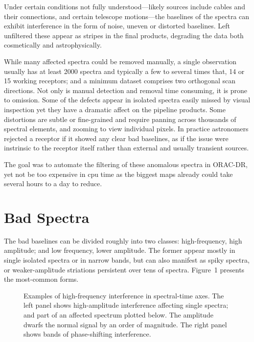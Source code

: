 Under certain conditions not fully understood---likely sources include 
cables and their connections, and certain telescope motions---the 
baselines of the spectra can exhibit interference in the form of noise, 
uneven or distorted baselines.  Left unfiltered these appear as stripes 
in the final products, degrading the data both cosmetically and 
astrophysically.

While many affected spectra could be removed manually, a single 
observation usually has at least 2000 spectra and typically a few to 
several times that, 14 or 15 working receptors; and a minimum dataset 
comprises two orthogonal scan directions.  Not only is manual detection 
and removal time consuming, it is prone to omission.  Some of the 
defects appear in isolated spectra easily missed by visual inspection 
yet they have a dramatic affect on the pipeline products.  Some 
distortions are subtle or fine-grained and require panning across 
thousands of spectral elements, and zooming to view individual pixels.  
In practice astronomers rejected a receptor if it showed any clear bad 
baselines, as if the issue were instrinsic to the receptor itself rather 
than external and usually transient sources.

The goal was to automate the filtering of these anomalous spectra in 
ORAC-DR, yet not be too expensive in cpu time as the biggest maps
already could take several hours to a day to reduce.

\section{Bad Spectra}

The bad baselines can be divided roughly into two classes: 
high-frequency, high amplitude; and low frequency, lower amplitude. The 
former appear mostly in single isolated spectra or in narrow bands,
but can also manifest as spiky spectra, or weaker-amplitude striations 
persistent over tens of spectra.  Figure~1 presents the most-common forms.

\begin{figure}[!ht]
\caption{Examples of high-frequency interference in spectral-time axes. 
The left panel shows high-amplitude interference affecting single
spectra; and part of an affected spectrum plotted below. The amplitude
dwarfs the normal signal by an order of magnitude. The right panel shows 
bands of phase-shifting interference.}
\end{figure}

